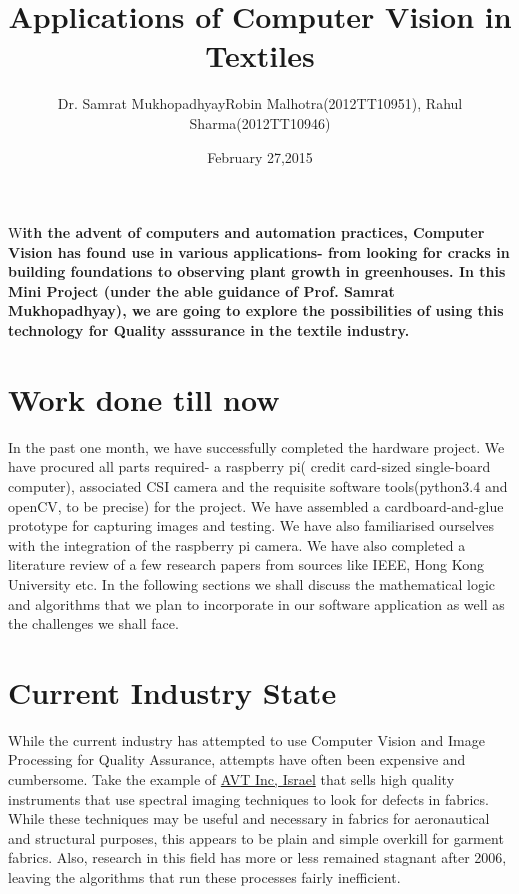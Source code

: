\documentclass[DIV=calc, paper=a4, fontsize=12pt, twocolumn]{scrartcl}	 %
\title{Applications of Computer Vision in Textiles} %
\author{Dr. Samrat Mukhopadhyay\newline Robin Malhotra(2012TT10951), Rahul Sharma(2012TT10946) } %
\date{February 27,2015} %
\newcommand{\initial}[1]{ %
\lettrine[lines=3,lhang=0.3,nindent=0em]{
\color{DarkGoldenrod}
{\textsf{#1}}}{}}
\begin{document}
\maketitle %

\thispagestyle{fancy} %


\initial{W}\textbf{ith the advent of computers and automation practices, Computer Vision has found use in various applications- from looking for cracks in building foundations to observing plant growth in greenhouses. In this Mini Project (under the able guidance of Prof. Samrat Mukhopadhyay), we are going to explore the possibilities of using this technology for Quality asssurance in the textile industry. }

\section{Work done till now}
In the past one month, we have successfully completed the hardware project. We have procured all parts required- a raspberry pi( credit card-sized single-board computer), associated CSI camera and the requisite software tools(python3.4 and openCV, to be precise) for the project. We have assembled a cardboard-and-glue prototype for capturing images and testing. We have also familiarised ourselves with the integration of the raspberry pi camera. We have also completed a literature review of a few research papers from sources like IEEE, Hong Kong University etc. In the following sections we shall discuss the mathematical logic and algorithms that we plan to incorporate in our software application as well as the challenges we shall face.

\section{Current Industry State}

While the current industry has attempted to use Computer Vision and Image Processing for Quality Assurance, attempts have often been expensive and cumbersome. Take the example of  \href{http://www.avt-inc.com/?catid=\%7B757EF709-E4DF-4C16-A2E7-5F7866D891AC\%7D}{AVT Inc, Israel} that sells high quality instruments that use spectral imaging techniques to look for defects in fabrics. While these techniques may be useful and necessary in fabrics for aeronautical and structural purposes, this appears to be plain and simple overkill for garment fabrics. Also, research in this field has more or less remained stagnant after 2006, leaving the algorithms that run these processes fairly inefficient.
\end{document}

